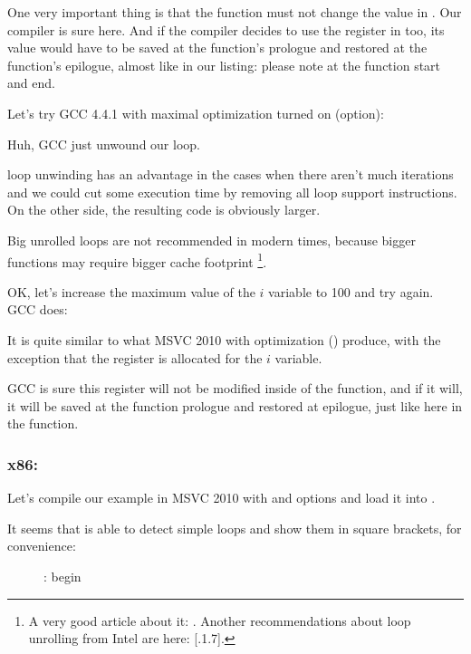 One very important thing is that the \ttf function must not change the value in \ESI.
Our compiler is sure here. 
And if the compiler decides to use the \ESI register in \ttf too, its value would have to be saved 
at the function's prologue and restored at the function's epilogue,
almost like in our listing: please note 
at the function start and end.

Let's try GCC 4.4.1 with maximal optimization turned on (\Othree option):




Huh, GCC just unwound our loop.

\Gls{loop unwinding} has an advantage in the cases when there aren't much iterations and 
we could cut some execution time by removing all loop support instructions. 
On the other side, the resulting code is obviously larger.

Big unrolled loops are not recommended in modern times, because bigger functions
may require bigger cache footprint%
%
\footnote{A very good article about it: \DrepperMemory.
Another recommendations about loop unrolling from Intel are here: 
[.1.7].}.

OK, let's increase the maximum value of the $i$ variable to 100 and try again. GCC does:



It is quite similar to what MSVC 2010 with optimization (\Ox) produce, 
with the exception that the \EBX register is allocated for the $i$ variable.

GCC is sure this register will not be modified inside of the \ttf function, 
and if it will, it will be saved at the function prologue and restored at epilogue, 
just like here in the \main function.

\clearpage
\subsubsection{x86: \olly}
\myindex{\olly}

Let's compile our example in MSVC 2010 with \Ox and \Obzero 
options and load it into \olly.

It seems that \olly is able to detect simple loops and show them in square brackets, for convenience:

\begin{figure}[H]
\centering
{}
\caption{\olly: \main begin}
\label{fig:loops_olly_1}
\end{figure}

